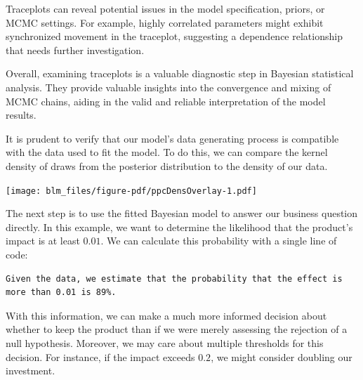 \documentclass[
  letterpaper,
  DIV=11,
  numbers=noendperiod]{scrreprt}
\newenvironment{Shaded}{\begin{snugshade}}{\end{snugshade}}
\newcommand{\AttributeTok}[1]{\textcolor[rgb]{0.40,0.45,0.13}{#1}}
\newcommand{\DecValTok}[1]{\textcolor[rgb]{0.68,0.00,0.00}{#1}}
\newcommand{\FloatTok}[1]{\textcolor[rgb]{0.68,0.00,0.00}{#1}}
\newcommand{\FunctionTok}[1]{\textcolor[rgb]{0.28,0.35,0.67}{#1}}
\newcommand{\NormalTok}[1]{\textcolor[rgb]{0.00,0.23,0.31}{#1}}
\newcommand{\SpecialCharTok}[1]{\textcolor[rgb]{0.37,0.37,0.37}{#1}}
\begin{document}
Traceplots can reveal potential issues in the model specification,
priors, or MCMC settings. For example, highly correlated parameters
might exhibit synchronized movement in the traceplot, suggesting a
dependence relationship that needs further investigation.

Overall, examining traceplots is a valuable diagnostic step in Bayesian
statistical analysis. They provide valuable insights into the
convergence and mixing of MCMC chains, aiding in the valid and reliable
interpretation of the model results.

It is prudent to verify that our model's data generating process is
compatible with the data used to fit the model. To do this, we can
compare the kernel density of draws from the posterior distribution to
the density of our data.

\begin{Shaded}
\end{Shaded}

\texttt{[image: blm\_files/figure-pdf/ppcDensOverlay-1.pdf]}

The next step is to use the fitted Bayesian model to answer our business
question directly. In this example, we want to determine the likelihood
that the product's impact is at least \(0.01\). We can calculate this
probability with a single line of code:

\begin{Shaded}
\end{Shaded}

\begin{verbatim}
Given the data, we estimate that the probability that the effect is more than 0.01 is 89%.
\end{verbatim}

With this information, we can make a much more informed decision about
whether to keep the product than if we were merely assessing the
rejection of a null hypothesis. Moreover, we may care about multiple
thresholds for this decision. For instance, if the impact exceeds
\(0.2\), we might consider doubling our investment.
\end{document}

